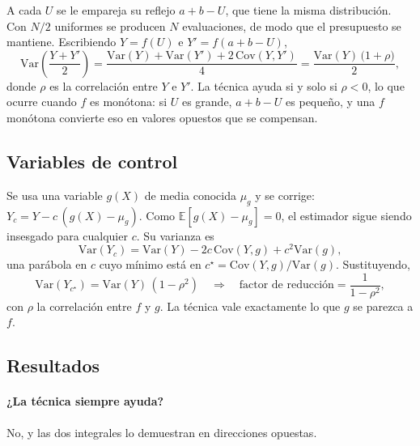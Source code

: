 A cada $U$ se le empareja su reflejo $a+b-U$, que tiene la misma distribución.
Con $N/2$ uniformes se producen $N$ evaluaciones, de modo que el presupuesto se
mantiene. Escribiendo $Y = f(U)$ e $Y' = f(a+b-U)$,
\begin{equation}
  \mathrm{Var}\!\left(\frac{Y+Y'}{2}\right)
  = \frac{\mathrm{Var}(Y) + \mathrm{Var}(Y') + 2\,\mathrm{Cov}(Y,Y')}{4}
  = \frac{\mathrm{Var}(Y)\,\bigl(1 + \rho\bigr)}{2},
  \label{eq:antiteticas}
\end{equation}
donde $\rho$ es la correlación entre $Y$ e $Y'$. La técnica ayuda si y solo si
$\rho < 0$, lo que ocurre cuando $f$ es monótona: si $U$ es grande, $a+b-U$ es
pequeño, y una $f$ monótona convierte eso en valores opuestos que se compensan.

\subsection{Variables de control}

Se usa una variable $g(X)$ de media conocida $\mu_g$ y se corrige:
$Y_c = Y - c\,(g(X) - \mu_g)$. Como $\mathbb{E}[g(X)-\mu_g] = 0$, el estimador
sigue siendo insesgado para cualquier $c$. Su varianza es
\[
  \mathrm{Var}(Y_c) = \mathrm{Var}(Y) - 2c\,\mathrm{Cov}(Y,g) + c^2\mathrm{Var}(g),
\]
una parábola en $c$ cuyo mínimo está en
$c^\star = \mathrm{Cov}(Y,g)/\mathrm{Var}(g)$. Sustituyendo,
\begin{equation}
  \mathrm{Var}(Y_{c^\star}) = \mathrm{Var}(Y)\,(1-\rho^2)
  \quad\Longrightarrow\quad
  \text{factor de reducción} = \frac{1}{1-\rho^2},
  \label{eq:control}
\end{equation}
con $\rho$ la correlación entre $f$ y $g$. La técnica vale exactamente lo que
$g$ se parezca a $f$.

\subsection{Resultados}

\begin{table}[H]
\centering\small

\caption{Factores de reducción con $N = 200\,000$ evaluaciones en todos los
casos.}
\label{tab:mc-varianza}
\end{table}

\paragraph{¿La técnica siempre ayuda?} No, y las dos integrales lo demuestran
en direcciones opuestas.

